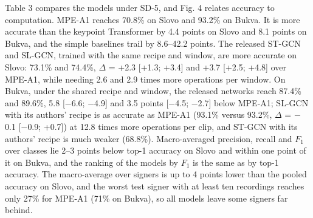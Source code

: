 \documentclass[a4paper,fleqn]{cas-dc}
\begin{document}
Table 3 compares the models under SD-5, and Fig. 4 relates accuracy to computation. MPE-A1 reaches 70.8\% on Slovo and 93.2\% on Bukva. It is more accurate than the keypoint Transformer by 4.4 points on Slovo and 8.1 points on Bukva, and the simple baselines trail by 8.6--42.2 points. The released ST-GCN and SL-GCN, trained with the same recipe and window, are more accurate on Slovo: 73.1\% and 74.4\%, \(\Delta\) = +2.3 {[}+1.3; +3.4{]} and +3.7 {[}+2.5; +4.8{]} over MPE-A1, while needing 2.6 and 2.9 times more operations per window. On Bukva, under the shared recipe and window, the released networks reach 87.4\% and 89.6\%, 5.8 {[}$-$6.6; $-$4.9{]} and 3.5 points {[}$-$4.5; $-$2.7{]} below MPE-A1; SL-GCN with its authors' recipe is as accurate as MPE-A1 (93.1\% versus 93.2\%, \(\Delta\) = $-$0.1 {[}$-$0.9; +0.7{]}) at 12.8 times more operations per clip, and ST-GCN with its authors' recipe is much weaker (68.8\%). Macro-averaged precision, recall and \(F_1\) over classes lie 2--3 points below top-1 accuracy on Slovo and within one point of it on Bukva, and the ranking of the models by \(F_1\) is the same as by top-1 accuracy. The macro-average over signers is up to 4 points lower than the pooled accuracy on Slovo, and the worst test signer with at least ten recordings reaches only 27\% for MPE-A1 (71\% on Bukva), so all models leave some signers far behind.
\end{document}
